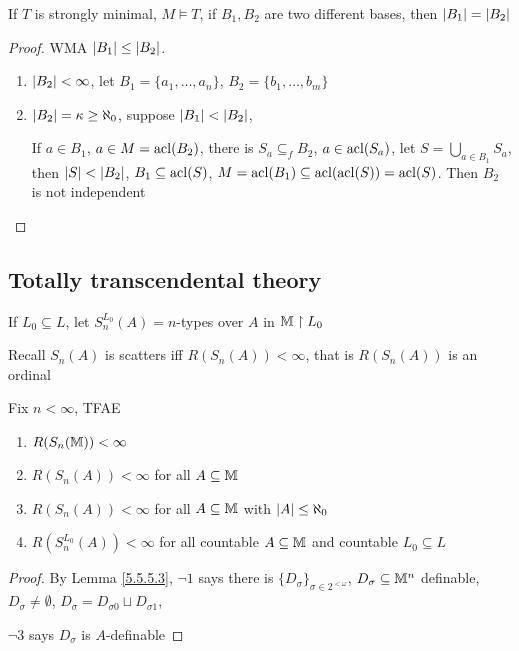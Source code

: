 \documentclass[11pt]{article}
\begin{document}
\begin{theorem}[]
If \(T\) is strongly minimal, \(M\vDash T\), if \(B_1,B_2\) are two different bases, then \(\abs{B_1}=\abs{B_2}\)
\end{theorem}

\begin{proof}
WMA \(\abs{B_1}\le\abs{B_2}\).

\begin{enumerate}
\item \(\abs{B_2}<\infty\), let \(B_1=\{a_1,\dots,a_n\}\), \(B_2=\{b_1,\dots,b_m\}\)
\item \(\abs{B_2}=\kappa\ge\aleph_0\), suppose \(\abs{B_1}<\abs{B_2}\),

If \(a\in B_1\), \(a\in M=\operatorname{acl}(B_2)\), there is \(S_a\subseteq_fB_2\), \(a\in\operatorname{acl}(S_a)\), let \(S=\bigcup_{a\in B_1}S_a\),
then \(\abs{S}<\abs{B_2}\), \(B_1\subseteq\operatorname{acl}(S)\), \(M=\operatorname{acl}(B_1)\subseteq\operatorname{acl}(\operatorname{acl}(S))=\operatorname{acl}(S)\). Then \(B_2\)
is not independent
\end{enumerate}
\end{proof}

\subsection{Totally transcendental theory}
\label{sec:org46081f8}
If \(L_0\subseteq L\), let \(S^{L_0}_n(A)= n\)-types over \(A\) in \(\mathbb{M}\upharpoonright L_0\)

Recall \(S_n(A)\) is scatters iff \(R(S_n(A))<\infty\), that is \(R(S_n(A))\) is an ordinal

\begin{lemma}[]
\label{5.7.7.1}
Fix \(n<\infty\), TFAE
\begin{enumerate}
\item \(R(S_n(\mathbb{M}))<\infty\)
\item \(R(S_n(A))<\infty\) for all \(A\subseteq\mathbb{M}\)
\item \(R(S_n(A))<\infty\) for all \(A\subseteq\mathbb{M}\) with \(\abs{A}\le\aleph_0\)
\item \(R(S_n^{L_0}(A))<\infty\) for all countable \(A\subseteq\mathbb{M}\) and countable \(L_0\subseteq L\)
\end{enumerate}
\end{lemma}

\begin{proof}
By Lemma \ref{5.5.5.3}, \(\neg 1\) says there is \(\{D_\sigma\}_{\sigma\in 2^{<\omega}}\), \(D_\sigma\subseteq\mathbb{M}^n\)
definable, \(D_\sigma\neq\emptyset\), \(D_\sigma=D_{\sigma 0}\sqcup D_{\sigma 1}\),

\(\neg 3\) says \(D_\sigma\) is \(A\)-definable
\end{proof}
\end{document}
